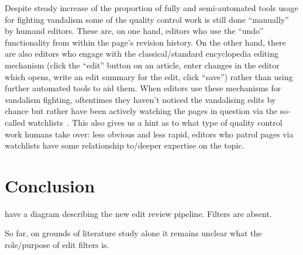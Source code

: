 Despite steady increase of the proportion of fully and semi-automated tools usage for fighting vandalism %
some of the quality control work is still done ``manually'' by humand editors.
These are, on one hand, editors who use the ``undo'' functionality from within the page's revision history.
On the other hand, there are also editors who engage with the classical/standard encyclopedia editing mechanism (click the ``edit'' button on an article, enter changes in the editor which opens, write an edit summary for the edit, click ``save'') rather than using further automated tools to aid them.
When editors use these mechanisms for vandalism fighting, oftentimes they haven't noticed the vandalising edits by chance but rather have been actively watching the pages in question via the so-called watchlists~\cite{AstHal2018}.
This also gives us a hint as to what type of quality control work humans take over: less obvious and less rapid, editors who patrol pages via watchlists have some relationship to/deeper expertise on the topic. %

\section{Conclusion}
\cite{AstHal2018} have a diagram describing the new edit review pipeline. Filters are absent.

So far, on grounds of literature study alone it remains unclear what the role/purpose of edit filters is.
